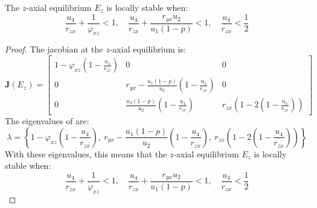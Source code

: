 \begin{theorem}\label{thm:axial-z-stability}
    The $z$-axial equilibrium $E_z$ is locally stable when:
    \begin{equation*}
        \frac{u_4}{r_{zx}}+\frac{1}{\varphi_{xz}} < 1,\quad
        \frac{u_4}{r_{zx}}+\frac{r_{yx}u_2}{u_1\left(1-p\right)} < 1,\quad
        \frac{u_4}{r_{zx}} < \frac{1}{2}
    \end{equation*}
\end{theorem}
\begin{proof}
    The jacobian at the $z$-axial equilibrium is:
    \begin{equation}\label{matrix:jacobian-axial-z}
        \textbf{J}\left(E_z\right) = \begin{bmatrix}
            1-\varphi_{xz}\left(1-\frac{u_4}{r_{zx}}\right) & 0 & 0\\
            0 & r_{yx}-\frac{u_1\left(1-p\right)}{u_2}\left(1-\frac{u_4}{r_{zx}}\right) & 0\\
            0 & \frac{u_3\left(1-p\right)}{u_2}\left(1-\frac{u_4}{r_{zx}}\right) & r_{zx}\left(1-2\left(1-\frac{u_4}{r_{zx}}\right)\right)
        \end{bmatrix}
    \end{equation}
    The eigenvalues of  are:
    \begin{equation*}
        \lambda=\left\{1-\varphi_{xz}\left(1-\frac{u_4}{r_{zx}}\right),\ r_{yx}-\frac{u_1\left(1-p\right)}{u_2}\left(1-\frac{u_4}{r_{zx}}\right),\ r_{zx}\left(1-2\left(1-\frac{u_4}{r_{zx}}\right)\right)\right\}
    \end{equation*}
    With these eigenvalues, this means that the $z$-axial equilibrium $E_z$ is locally stable when:
    \begin{equation*}
        \frac{u_4}{r_{zx}}+\frac{1}{\varphi_{xz}} < 1,\quad \frac{u_4}{r_{zx}}+\frac{r_{yx}u_2}{u_1\left(1-p\right)}<1,\quad \frac{u_4}{r_{zx}}<\frac{1}{2}
    \end{equation*}
\end{proof}

